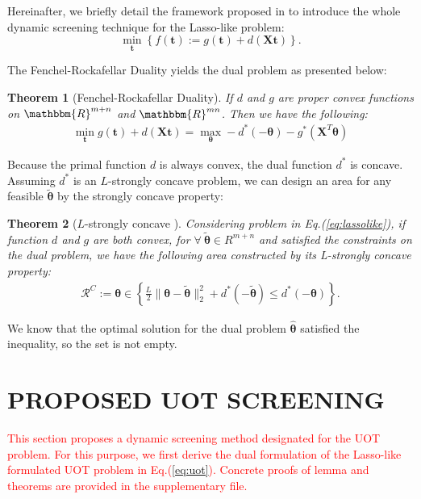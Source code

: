 \documentclass[twoside]{article}
\theoremstyle{plain}
\newtheorem{thm}{Theorem}
\newcommand{\tranT}{T}
\newcommand{\mat}[1]{\mathbf{#1}}
\renewcommand{\vec}[1]{\bm{#1}}
\newcommand{\changeHK}[1]{\textcolor{red}{#1}}
\begin{document}
Hereinafter, we briefly detail the framework proposed in \citep{NEURIPS2021_7b5b23f4} to introduce the whole dynamic screening technique for the Lasso-like problem:
\begin{equation}
\label{eq:lassolike}
\min_{\vec{t}} \left\{ f(\vec{t}) := g(\vec{t}) + d(\mat{X} \vec{t}) \right\}.
\end{equation}

The Fenchel-Rockafellar Duality yields the dual problem as presented below:
\begin{thm}[Fenchel-Rockafellar Duality] 
\label{Thm:FRD}
If $d$ and $g$ are proper convex functions on $\mathbbm{R}^{m+n}$ and $\mathbbm{R}^{mn}$. Then we have the following:
 $$
\begin{aligned}
\min_{\vec{t}} g(\vec{t}) + d(\mat{X}\vec{t}) = \max_{\vec{\vec{\theta}}} -d^*(-\vec{\theta})-g^*(\mat{X}^{\tranT}\vec{\theta})
\end{aligned}
$$
\end{thm}

Because the primal function $d$ is always convex, the dual function $d^*$ is concave. Assuming $d^*$ is an $L$-strongly concave problem, we can design an area for any feasible $\tilde{\vec{\theta}}$ by the strongly concave property:

\begin{thm}[$L$-strongly concave \changeHK{\citep[Theorem 5]{NEURIPS2021_7b5b23f4}}]\label{circle}
Considering problem in Eq.(\ref{eq:lassolike}), if function $d$ and $g$ are both convex, for $\forall \ \tilde{\vec{\theta}} \in{R^{m+n}}$ and satisfied the constraints on the dual problem, we have the following area constructed by its L-strongly concave property:  
$$
\begin{aligned}
\mathcal{R}^{C}:=\vec{\theta} \in \left\{\frac{L}{2}\|\vec{\theta}-\tilde{\vec{\theta}}\|_2^2+d^*(-\tilde{\vec{\theta}}) \leq d^*(-\vec{\theta})\right\}.
\end{aligned}
$$
\end{thm}

We know that the optimal solution for the dual problem $\hat{\vec{\theta}}$ satisfied the inequality, so the set is not empty.



\section{PROPOSED UOT SCREENING}

\changeHK{This section proposes a dynamic screening method designated for the UOT problem. For this purpose, we first derive the dual formulation of the Lasso-like formulated UOT problem in Eq.(\ref{eq:uot}). Concrete proofs of lemma and theorems are provided in the supplementary file.}
\end{document}
